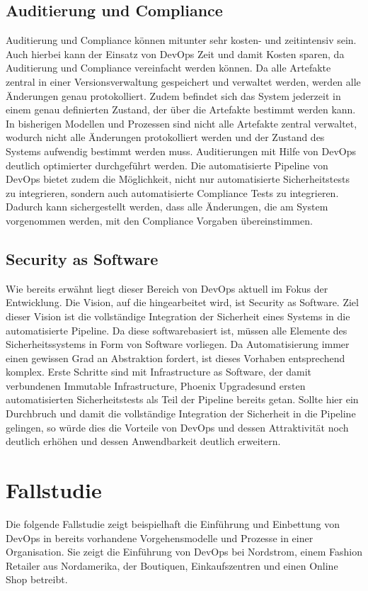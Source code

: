 \subsection{Auditierung und Compliance}
Auditierung und Compliance können mitunter sehr kosten- und zeitintensiv sein. Auch hierbei kann der Einsatz von DevOps Zeit und damit Kosten sparen, da Auditierung und Compliance vereinfacht werden können. Da alle Artefakte zentral in einer Versionsverwaltung gespeichert und verwaltet werden, werden alle Änderungen genau protokolliert. Zudem befindet sich das System jederzeit in einem genau definierten Zustand, der über die Artefakte bestimmt werden kann. In bisherigen Modellen und Prozessen sind nicht alle Artefakte zentral verwaltet, wodurch nicht alle Änderungen protokolliert werden und der Zustand des Systems aufwendig bestimmt werden muss. Auditierungen mit Hilfe von DevOps deutlich optimierter durchgeführt werden. Die automatisierte Pipeline von DevOps bietet zudem die Möglichkeit, nicht nur automatisierte Sicherheitstests zu integrieren, sondern auch automatisierte Compliance Tests zu integrieren. Dadurch kann sichergestellt werden, dass alle Änderungen, die am System vorgenommen werden, mit den Compliance Vorgaben übereinstimmen.\\

\subsection{Security as Software}
Wie bereits erwähnt liegt dieser Bereich von DevOps aktuell im Fokus der Entwicklung. Die Vision, auf die hingearbeitet wird, ist \glqq Security as Software\grqq. Ziel dieser Vision ist die vollständige Integration der Sicherheit eines Systems in die automatisierte Pipeline. Da diese softwarebasiert ist, müssen alle Elemente des Sicherheitssystems in Form von Software vorliegen. Da Automatisierung immer einen gewissen Grad an Abstraktion fordert, ist dieses Vorhaben entsprechend komplex. Erste Schritte sind mit \glqq Infrastructure as Software\grqq, der damit verbundenen \glqq Immutable Infrastructure\grqq, \glqq Phoenix Upgrades\grqq und ersten automatisierten Sicherheitstests als Teil der Pipeline bereits getan. Sollte hier ein Durchbruch und damit die vollständige Integration der Sicherheit in die Pipeline gelingen, so würde dies die Vorteile von DevOps und dessen Attraktivität noch deutlich erhöhen und dessen Anwendbarkeit deutlich erweitern.

\newpage
\section{Fallstudie} %
Die folgende Fallstudie zeigt beispielhaft die Einführung und Einbettung von DevOps in bereits vorhandene Vorgehensmodelle und Prozesse in einer Organisation. Sie zeigt die Einführung von DevOps bei Nordstrom, einem Fashion Retailer aus Nordamerika, der Boutiquen, Einkaufszentren und einen Online Shop betreibt.

